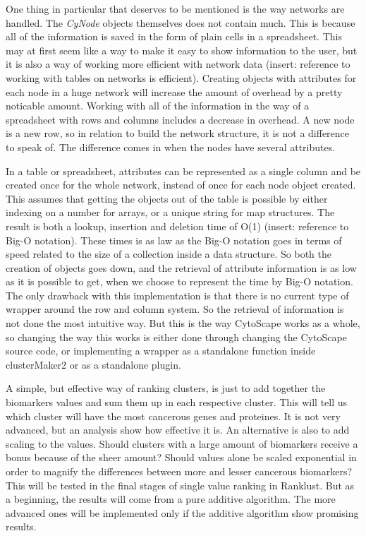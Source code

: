 \documentclass[UKenglish]{ifimaster}
\begin{document}
One thing in particular that deserves to be mentioned is the way networks are handled. The \textit{CyNode} objects
themselves does not contain much. This is because all of the information is saved in the form of plain cells in a
spreadsheet. This may at first seem like a way to make it easy to show information to the user, but it is also a way of
working more efficient with network data (insert: reference to working with tables on networks is efficient). Creating
objects with attributes for each node in a huge network will increase the amount of overhead by a pretty noticable
amount. Working with all of the information in the way of a spreadsheet with rows and columns includes a decrease in
overhead. A new node is a new row, so in relation to build the network structure, it is not a difference to speak of.
The difference comes in when the nodes have several attributes. 

In a table or spreadsheet, attributes can be represented as a single column and be created once for the whole network,
instead of once for each node object created. This assumes that getting the objects out of the table is possible by
either indexing on a number for arrays, or a unique string for map structures. The result is both a lookup, insertion
and deletion time of O(1) (insert: reference to Big-O notation).  These times is as law as the Big-O notation goes in
terms of speed related to the size of a collection inside a data structure. So both the creation of objects goes down,
and the retrieval of attribute information is as low as it is possible to get, when we choose to represent the time by
Big-O notation. The only drawback with this implementation is that there is no current type of wrapper around the row
and column system. So the retrieval of information is not done the most intuitive way. But this is the way CytoScape
works as a whole, so changing the way this works is either done through changing the CytoScape source code, or
implementing a wrapper as a standalone function inside clusterMaker2 or as a standalone plugin.

A simple, but effective way of ranking clusters, is just to add together the biomarkers values and sum them up in each
respective cluster. This will tell us which cluster will have the most cancerous genes and proteines. It is not very
advanced, but an analysis show how effective it is. An alternative is also to add scaling to the values. Should clusters
with a large amount of biomarkers receive a bonus because of the sheer amount? Should values alone be scaled exponential
in order to magnify the differences between more and lesser cancerous biomarkers? This will be tested in the final
stages of single value ranking in Ranklust. But as a beginning, the results will come from a pure additive algorithm.
The more advanced ones will be implemented only if the additive algorithm show promising results.
\end{document}
